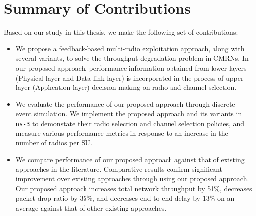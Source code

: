
\section{Summary of Contributions}

Based on our study in this thesis, we make the following set of contributions:

\begin{itemize}
\item We propose a feedback-based multi-radio exploitation approach, along with several variants, to solve the throughput degradation problem in CMRNs. In our proposed approach, performance information obtained from lower layers (Physical layer and Data link layer) is incorporated in the process of upper layer (Application layer) decision making on radio and channel selection.
\item We evaluate the performance of our proposed approach through discrete-event simulation. We implement the proposed approach and its variants in \texttt{ns-3} to demonstate their radio selection and channel selection policies, and measure various performance metrics in response to an increase in the number of radios per SU.
\item We compare performance of our proposed approach against that of existing approaches in the literature. Comparative results confirm significant improvement over existing approaches through using our proposed approach. Our proposed approach increases total network throughput by 51\%, decreases packet drop ratio by 35\%, and decreases end-to-end delay by 13\% on an average against that of other existing approaches.
\end{itemize}
\endinput
